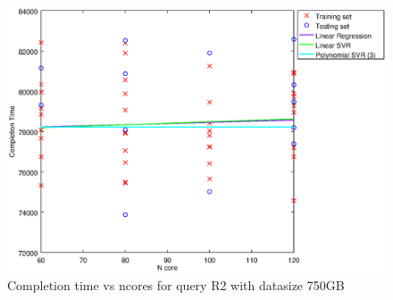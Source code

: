 
\begin {figure}[hbtp]
\centering
\includegraphics[width=\textwidth]{output/R2_750_LINEAR_NCORE/plot_R2_750_bestmodels.eps}
\caption{Completion time vs ncores for query R2 with datasize 750GB}
\label{fig:coreonly_linear_R2_750}
\end {figure}
